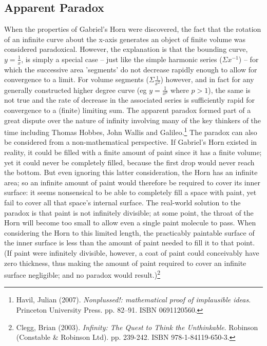 \documentclass[10pt]{report}
\begin{document}
\subsection{Apparent Paradox}
When the properties of Gabriel's Horn were discovered, the fact that the rotation of an infinite curve about the x-axis generates an object of finite volume was considered paradoxical. However, the explanation is that the bounding curve, $y=\frac{1}{x}$, is simply a special case – just like the simple harmonic series ($\Sigma x^{-1}$) – for which the successive area 'segments' do not decrease rapidly enough to allow for convergence to a limit. For volume segments ($\Sigma \frac{1}{x^2}$) however, and in fact for any generally constructed higher degree curve (eg $y = \frac{1}{x^p}$ where $p>1$), the same is not true and the rate of decrease in the associated series is sufficiently rapid for convergence to a (finite) limiting sum.
The apparent paradox formed part of a great dispute over the nature of infinity involving many of the key thinkers of the time including Thomas Hobbes, John Wallis and Galileo.\footnote{Havil, Julian (2007). \textit{Nonplussed!: mathematical proof of implausible ideas}. Princeton University Press. pp. 82–91. ISBN 0691120560.}
The paradox can also be considered from a non-mathematical perspective. If Gabriel’s Horn existed in reality, it could be filled with a finite amount of paint since it has a finite volume; yet it could never be completely filled, because the first drop would never reach the bottom. But even ignoring this latter consideration, the Horn has an infinite area; so an infinite amount of paint would therefore be required to cover its inner surface: it seems nonsensical to be able to completely fill a space with paint, yet fail to cover all that space's internal surface. The real-world solution to the paradox is that paint is not infinitely divisible; at some point, the throat of the Horn will become too small to allow even a single paint molecule to pass. When considering the Horn to this limited length, the practicably paintable surface of the inner surface is less than the amount of paint needed to fill it to that point. (If paint were infinitely divisible, however, a coat of paint could conceivably have zero thickness, thus making the amount of paint required to cover an infinite surface negligible; and no paradox would result.)\footnote{Clegg, Brian (2003). \textit{Infinity: The Quest to Think the Unthinkable}. Robinson (Constable \& Robinson Ltd). pp. 239-242. ISBN 978-1-84119-650-3.}
\end{document}

